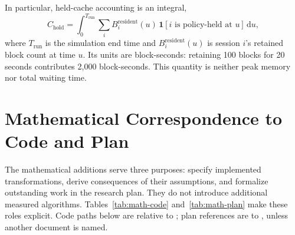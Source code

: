 \documentclass[11pt,a4paper]{article}
\begin{document}
In particular, held-cache accounting is an integral,
\begin{equation}
C_{\mathrm{hold}}=\int_0^{T_{\mathrm{run}}}\sum_i B_i^{\mathrm{resident}}(u)\,\mathbf{1}[i\text{ is policy-held at }u]\,\mathrm{d}u,
\end{equation}
where \(T_{\mathrm{run}}\) is the simulation end time and \(B_i^{\mathrm{resident}}(u)\) is session \(i\)'s retained block count at time \(u\). Its units are block-seconds: retaining 100 blocks for 20 seconds contributes 2,000 block-seconds. This quantity is neither peak memory nor total waiting time.


\clearpage
\section{Mathematical Correspondence to Code and Plan}
\label{app:math-code}
\setcounter{table}{0}
\renewcommand{\thetable}{C\arabic{table}}
The mathematical additions serve three purposes: specify implemented transformations, derive consequences of their assumptions, and formalize outstanding work in the research plan. They do not introduce additional measured algorithms. Tables~\ref{tab:math-code} and~\ref{tab:math-plan} make these roles explicit. Code paths below are relative to ; plan references are to , unless another document is named.
\end{document}
